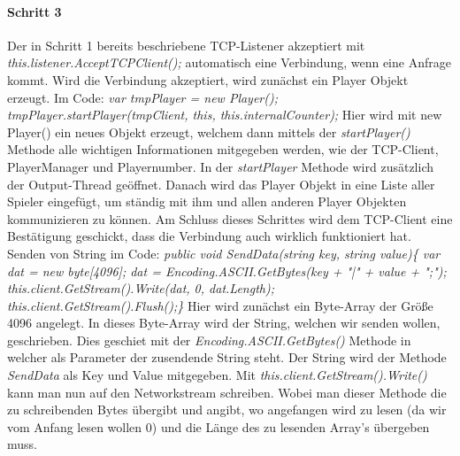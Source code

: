 \paragraph{Schritt 3}
Der in Schritt 1 bereits beschriebene TCP-Listener akzeptiert mit \textit{this.listener.AcceptTCPClient();} automatisch eine Verbindung, wenn eine Anfrage kommt.
Wird die Verbindung akzeptiert, wird zunächst ein Player Objekt erzeugt. Im Code: 
\newline 
\textit{var tmpPlayer = new Player(); \newline
tmpPlayer.startPlayer(tmpClient, this, this.internalCounter);}
\newline
Hier wird mit new Player() ein neues Objekt erzeugt, welchem dann mittels der \textit{startPlayer()} Methode alle wichtigen Informationen mitgegeben werden, wie der TCP-Client, PlayerManager und Playernumber. In der \textit{startPlayer} Methode wird zusätzlich der Output-Thread geöffnet.
Danach wird das Player Objekt in eine Liste aller Spieler eingefügt, um ständig mit ihm und allen anderen Player Objekten kommunizieren zu können. Am Schluss dieses Schrittes wird dem TCP-Client eine Bestätigung geschickt, dass die Verbindung auch wirklich funktioniert hat. Senden von String im Code:
\newline
\textit{
public void SendData(string key, string value)\{\newline
var dat = new byte[4096];\newline
dat = Encoding.ASCII.GetBytes(key + "|" + value + ";");\newline
this.client.GetStream().Write(dat, 0, dat.Length);\newline
this.client.GetStream().Flush();\newline \}
} \newline
Hier wird zunächst ein Byte-Array der Größe 4096 angelegt. In dieses Byte-Array wird der String, welchen wir senden wollen, geschrieben. 
Dies geschiet mit der \textit{Encoding.ASCII.GetBytes()} Methode in welcher als Parameter der zusendende String steht. 
Der String wird der Methode \textit{SendData} als Key und Value mitgegeben. Mit \textit{this.client.GetStream().Write()} kann man nun auf den Networkstream schreiben.
Wobei man dieser Methode die zu schreibenden Bytes übergibt und angibt, wo angefangen wird zu lesen (da wir vom Anfang lesen wollen 0) und die Länge des zu lesenden Array's übergeben muss.
